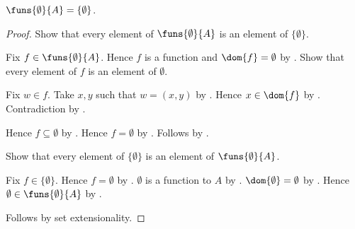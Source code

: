 \begin{proposition}\label{empty_domain_function_space}
    $\funs{\emptyset}{A}=\{\emptyset\}$.
\end{proposition}
\begin{proof}
    Show that every element of $\funs{\emptyset}{A}$ is an element of
        $\{\emptyset\}$.
    \begin{subproof}
        Fix $f\in\funs{\emptyset}{A}$.
        Hence $f$ is a function and $\dom{f}=\emptyset$
            by .
        Show that every element of $f$ is an element of $\emptyset$.
        \begin{subproof}
            Fix $w\in f$.
            Take $x,y$ such that $w=(x,y)$ by .
            Hence $x\in\dom{f}$ by .
            Contradiction by .
        \end{subproof}
        Hence $f\subseteq\emptyset$ by .
        Hence $f=\emptyset$ by .
        Follows by .
    \end{subproof}
    Show that every element of $\{\emptyset\}$ is an element of
        $\funs{\emptyset}{A}$.
    \begin{subproof}
        Fix $f\in\{\emptyset\}$.
        Hence $f=\emptyset$ by .
        $\emptyset$ is a function to $A$
            by .
        $\dom{\emptyset}=\emptyset$ by .
        Hence $\emptyset\in\funs{\emptyset}{A}$ by .
    \end{subproof}
    Follows by set extensionality.
\end{proof}

